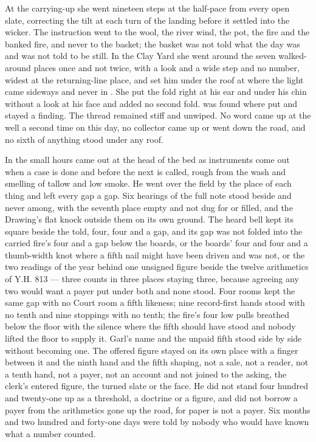 At the carrying-up she went nineteen steps at the half-pace from every open slate, correcting the tilt at each turn of the landing before it settled into the wicker. The instruction went to the wool, the river wind, the pot, the fire and the banked fire, and never to the basket; the basket was not told what the day was and was not told to be still. In the Clay Yard she went around the seven walked-around places once and not twice, with a look and a wide step and no number, widest at the returning-line place, and set him under the roof at  where the light came sideways and never in . She put the fold right at his ear and under his chin without a look at his face and added no second fold.  was found where put and stayed a finding. The thread remained stiff and unwiped. No word came up at the well a second time on this day, no collector came up or went down the road, and no sixth of anything stood under any roof.

\scenebreak

In the small hours  came out at the head of the bed as instruments come out when a case is done and before the next is called, rough from the wash and smelling of tallow and low smoke. He went over the field by the place of each thing and left every gap a gap. Six hearings of the full note stood beside and never among, with the seventh place empty and not dug for or filled, and the Drawing's flat knock outside them on its own ground. The heard bell kept its square beside the told, four, four and a gap, and its gap was not folded into the carried fire's four and a gap below the boards, or the boards' four and four and a thumb-width knot where a fifth nail might have been driven and was not, or the two readings of the year behind one unsigned figure beside the twelve arithmetics of Y.H. 813 --- three counts in three places staying three, because agreeing any two would want a payer put under both and none stood. Four rooms kept the same gap with no Court room a fifth likeness; nine record-first hands stood with no tenth and nine stoppings with no tenth; the fire's four low pulls breathed below the floor with the silence where the fifth should have stood and nobody lifted the floor to supply it. Garl's name and the unpaid fifth stood side by side without becoming one. The offered figure stayed on its own place with a finger between it and the ninth hand and the fifth shaping, not a sale, not a reader, not a tenth hand, not a payer, not an account and not joined to the asking, the clerk's entered figure, the turned slate or the face. He did not stand four hundred and twenty-one up as a threshold, a doctrine or a figure, and did not borrow a payer from the arithmetics gone up the road, for paper is not a payer. Six months and two hundred and forty-one days were told by nobody who would have known what a number counted.

